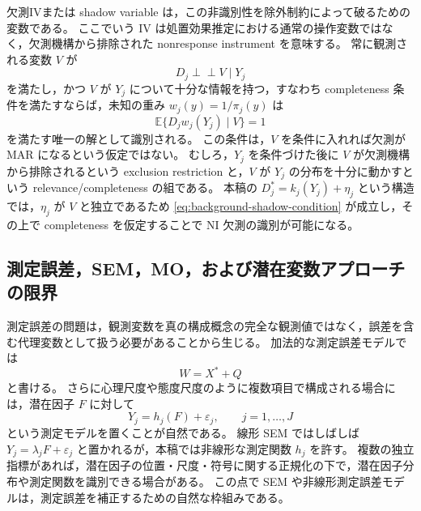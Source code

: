 \documentclass[dvipdfmx,autodetect-engine]{jsarticle}
\newcommand{\indep}{\mathrel{\perp\!\!\!\perp}}
\newcommand{\E}{\mathbb{E}}
\newcommand{\1}{\mathbf{1}}
\begin{document}
欠測IVまたは shadow variable は，この非識別性を除外制約によって破るための変数である。
ここでいう IV は処置効果推定における通常の操作変数ではなく，欠測機構から排除された nonresponse instrument を意味する。
常に観測される変数 $V$ が
\begin{equation}
  D_j\indep V\mid Y_j
  \label{eq:background-shadow-condition}
\end{equation}
を満たし，かつ $V$ が $Y_j$ について十分な情報を持つ，すなわち completeness 条件を満たすならば，未知の重み $w_j(y)=1/\pi_j(y)$ は
\begin{equation}
  \E\{D_j w_j(Y_j)\mid V\}=1
  \label{eq:background-shadow-moment}
\end{equation}
を満たす唯一の解として識別される。
この条件は，$V$ を条件に入れれば欠測が MAR になるという仮定ではない。
むしろ，$Y_j$ を条件づけた後に $V$ が欠測機構から排除されるという exclusion restriction と，$V$ が $Y_j$ の分布を十分に動かすという relevance/completeness の組である。
本稿の $D_j^*=k_j(Y_j)+\eta_j$ という構造では，$\eta_j$ が $V$ と独立であるため \eqref{eq:background-shadow-condition} が成立し，その上で completeness を仮定することで NI 欠測の識別が可能になる。

\subsection{測定誤差，SEM，MO，および潜在変数アプローチの限界}

測定誤差の問題は，観測変数を真の構成概念の完全な観測値ではなく，誤差を含む代理変数として扱う必要があることから生じる。
加法的な測定誤差モデルでは
\begin{equation}
  W=X^*+Q
  \label{eq:background-additive-measurement-error}
\end{equation}
と書ける。
さらに心理尺度や態度尺度のように複数項目で構成される場合には，潜在因子 $F$ に対して
\begin{equation}
  Y_j=h_j(F)+\varepsilon_j,
  \qquad j=1,\ldots,J
  \label{eq:background-latent-measurement}
\end{equation}
という測定モデルを置くことが自然である。
線形 SEM ではしばしば $Y_j=\lambda_j F+\varepsilon_j$ と置かれるが，本稿では非線形な測定関数 $h_j$ を許す。
複数の独立指標があれば，潜在因子の位置・尺度・符号に関する正規化の下で，潜在因子分布や測定関数を識別できる場合がある。
この点で SEM や非線形測定誤差モデルは，測定誤差を補正するための自然な枠組みである。
\end{document}
